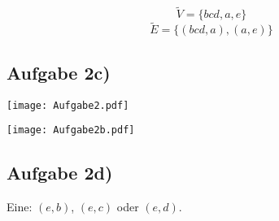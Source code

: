 \documentclass[a4paper,10pt]{article}
\begin{document}
\[\widetilde{V} = \{bcd, a, e\}\]
\[\widetilde{E} = \{(bcd, a), (a, e)\}\]

\subsection*{Aufgabe 2c)}

\begin{minipage}{0.49\textwidth}
    \begin{center}
        \texttt{[image: Aufgabe2.pdf]}
    \end{center}
\end{minipage}
\begin{minipage}{0.49\textwidth}
    \begin{center}
        \texttt{[image: Aufgabe2b.pdf]}
    \end{center}
\end{minipage}

\subsection*{Aufgabe 2d)}

Eine: $(e, b)$, $(e, c)$ oder $(e, d)$.
\end{document}
